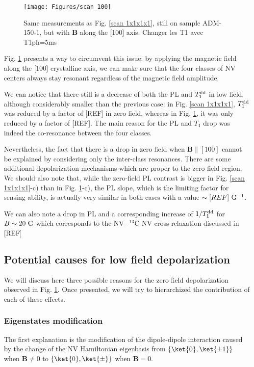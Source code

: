 \documentclass[a4paper,11pt]{report}
\begin{document}
\begin{figure}[h]
\centering
\texttt{[image: Figures/scan\_100]}
\caption{Same measurements as Fig. \ref{scan 1x1x1x1}, still on sample ADM-150-1, but with $\mathbf{B}$ along the [100] axis. Changer les T1 avec T1ph=5ms}
\label{scan 100}
\end{figure}

Fig. \ref{scan 100} presents a way to circumvent this issue: by applying the magnetic field along the [100] crystalline axis, we can make sure that the four classes of NV centers always stay resonant regardless of the magnetic field amplitude.

We can notice that there still is a decrease of both the PL and $T_1^{\rm dd}$ in low field, although considerably smaller than the previous case: in Fig. \ref{scan 1x1x1x1}, $T_1^{\rm dd}$ was reduced by a factor of [REF] in zero field, whereas in Fig. \ref{scan 100}, it was only reduced by a factor of [REF]. The main reason for the PL and $T_1$ drop was indeed the co-resonance between the four classes.

Nevertheless, the fact that there is a drop in zero field when $\mathbf{B} \parallel [100]$ cannot be explained by considering only the inter-class resonances. There are some additional depolarization mechanisms which are proper to the zero field region. We should also note that, while the zero-field PL contrast is bigger in Fig. \ref{scan 1x1x1x1}-c) than in Fig. \ref{scan 100}-c), the PL slope, which is the limiting factor for sensing ability, is actually very similar in both cases with a value $\sim [REF]\ \rm G^{-1}$.

We can also note a drop in PL and a corresponding increase of $1/T_1^{\rm dd}$ for $B \sim 20\ \rm G$ which corresponds to the NV$-^{13}$C-NV cross-relaxation discussed in [REF]

\subsection{Potential causes for low field depolarization}

We will discuss here three possible reasons for the zero field depolarization observed in Fig. \ref{scan 100}. Once presented, we will try to hierarchized the contribution of each of these effects.

\subsubsection{Eigenstates modification}
The first explanation is the modification of the dipole-dipole interaction caused by the change of the NV Hamiltonian eigenbasis from $\{ \ket{0}, \ket{\pm 1} \}$ when $\mathbf{B} \neq 0$ to $\{ \ket{0}, \ket{\pm} \}$ when $\mathbf{B} = 0$.
\end{document}
